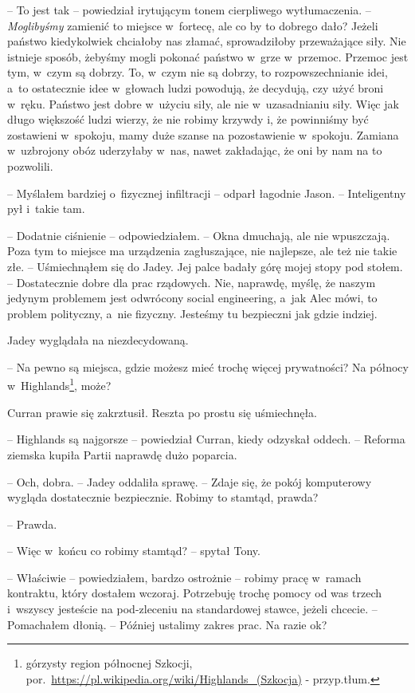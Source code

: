 \documentclass[oneside,polish,12pt,sfheadings]{mwbk}
\begin{document}
-- To jest tak -- powiedział irytującym tonem cierpliwego wytłumaczenia. --
\emph{Moglibyśmy} zamienić to miejsce w~fortecę, ale co by to dobrego
dało? Jeżeli państwo kiedykolwiek chciałoby nas złamać, sprowadziłoby
przeważające siły. Nie istnieje sposób, żebyśmy mogli pokonać państwo w~grze w~przemoc. Przemoc jest tym, w~czym są dobrzy. To, w~czym nie są
dobrzy, to rozpowszechnianie idei, a~to ostatecznie idee w~głowach ludzi
powodują, że decydują, czy użyć broni w~ręku. Państwo jest dobre w~użyciu siły, ale nie w~uzasadnianiu siły. Więc jak długo większość ludzi
wierzy, że nie robimy krzywdy i, że powinniśmy być zostawieni w~spokoju,
mamy duże szanse na pozostawienie w~spokoju. Zamiana w~uzbrojony obóz
uderzyłaby w~nas, nawet zakładając, że oni by nam na to pozwolili.

-- Myślałem bardziej o~fizycznej infiltracji -- odparł łagodnie Jason. -- Inteligentny pył i~takie tam.

-- Dodatnie ciśnienie -- odpowiedziałem. -- Okna dmuchają, ale nie
wpuszczają. Poza tym to miejsce ma urządzenia zagłuszające, nie
najlepsze, ale też nie takie złe. -- Uśmiechnąłem się do Jadey. Jej palce
badały górę mojej stopy pod stołem. -- Dostatecznie dobre dla prac
rządowych. Nie, naprawdę, myślę, że naszym jedynym problemem jest
odwrócony social engineering, a~jak Alec mówi, to problem polityczny, a~nie fizyczny. Jesteśmy tu bezpieczni jak gdzie indziej.

Jadey wyglądała na niezdecydowaną. 

-- Na pewno są miejsca, gdzie możesz
mieć trochę więcej prywatności? Na północy w~Highlands\footnote{górzysty region północnej Szkocji,
por.~\url{https://pl.wikipedia.org/wiki/Highlands\_(Szkocja)} - przyp.tłum.},
może?

Curran prawie się zakrztusił. Reszta po prostu się uśmiechnęła. 

-- Highlands są najgorsze -- powiedział Curran, kiedy odzyskał oddech. --
Reforma ziemska kupiła Partii naprawdę dużo poparcia.

-- Och, dobra. -- Jadey oddaliła sprawę. -- Zdaje się, że pokój komputerowy
wygląda dostatecznie bezpiecznie. Robimy to stamtąd, prawda?

-- Prawda.

-- Więc w~końcu co robimy stamtąd? -- spytał Tony.

-- Właściwie -- powiedziałem, bardzo ostrożnie -- robimy pracę w~ramach
kontraktu, który dostałem wczoraj. Potrzebuję trochę pomocy od was
trzech i~wszyscy jesteście na pod-zleceniu na standardowej stawce, jeżeli
chcecie. -- Pomachałem dłonią. -- Później ustalimy zakres prac. Na razie
ok?
\end{document}
